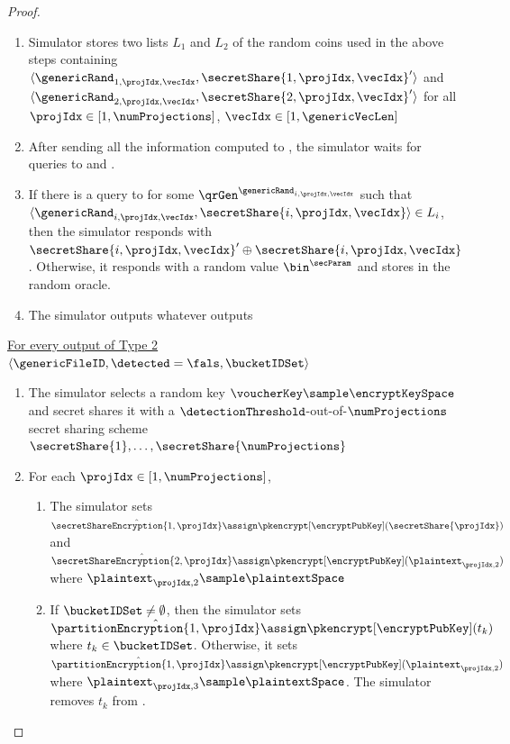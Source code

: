 \begin{proof}
\begin{enumerate}
\item Simulator stores two lists $L_1$ and $L_2$ of the random coins used in the above steps containing $\langle \genericRand_{1, \projIdx, \vecIdx}, \secretShare{1, \projIdx, \vecIdx}'\rangle$ and  $\langle \genericRand_{2, \projIdx, \vecIdx}, \secretShare{2, \projIdx, \vecIdx}'\rangle$ for all $\projIdx \in [1, \numProjections]$, $\vecIdx \in [1, \genericVecLen]$

\item After sending all the information computed to \server, the simulator waits for queries to \primeRO and \ro. 

\item If there is a query to \ro for some $\qrGen^{\genericRand_{i, \projIdx, \vecIdx}}$ such that  $\langle \genericRand_{i, \projIdx, \vecIdx}, \secretShare{i, \projIdx, \vecIdx} \rangle \in L_i$, then the simulator responds with $\secretShare{i, \projIdx, \vecIdx}' \oplus \secretShare{i, \projIdx, \vecIdx}$. Otherwise, it responds with a random value $\bin^{\secParam}$ and stores in the random oracle. 
\item The simulator outputs whatever \server outputs
\end{enumerate}


\smallskip\underline{For every output of Type 2 $\langle \genericFileID, \detected = \fals, \bucketIDSet \rangle$}

\begin{enumerate}


\item The simulator selects a random key $\voucherKey \sample \encryptKeySpace$ and secret shares it with a $\detectionThreshold$-out-of-$\numProjections$ secret sharing scheme $\secretShare{1}, \dots, \secretShare{\numProjections}$


\item For each $\projIdx \in [1, \numProjections]$,

\begin{enumerate}
\item The simulator sets $\hat{\secretShareEncryption{1, \projIdx}} \assign  \pkencrypt[\encryptPubKey](\secretShare{\projIdx})$ and $\hat{\secretShareEncryption{2, \projIdx}} \assign  \pkencrypt[\encryptPubKey](\plaintext_{\projIdx, 2})$  where $\plaintext_{\projIdx, 2} \sample \plaintextSpace$ 



\item If $\bucketIDSet \neq \emptyset$, then the simulator sets $\hat{\partitionEncryption{1, \projIdx}} \assign \pkencrypt[\encryptPubKey](t_k)$ where $t_k \in \bucketIDSet$. Otherwise, it sets $\hat{\partitionEncryption{1, \projIdx}} \assign \pkencrypt[\encryptPubKey](\plaintext_{\projIdx, 2})$ where $\plaintext_{\projIdx, 3} \sample \plaintextSpace$. The simulator removes $t_k$ from \bucketIDSet. 


\end{enumerate}
\end{enumerate}
\end{proof}
